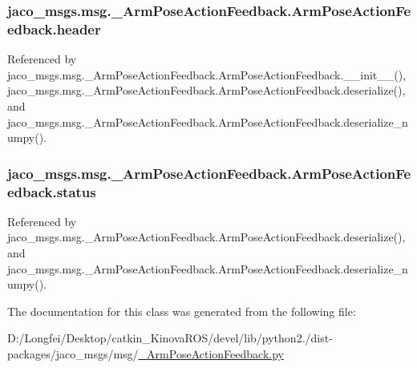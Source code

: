 \subsubsection[{\texorpdfstring{header}{header}}]{\setlength{\rightskip}{0pt plus 5cm}jaco\+\_\+msgs.\+msg.\+\_\+\+Arm\+Pose\+Action\+Feedback.\+Arm\+Pose\+Action\+Feedback.\+header}\hypertarget{classjaco__msgs_1_1msg_1_1__ArmPoseActionFeedback_1_1ArmPoseActionFeedback_a29a02efc077766aa6b97432487639dfe}{}\label{classjaco__msgs_1_1msg_1_1__ArmPoseActionFeedback_1_1ArmPoseActionFeedback_a29a02efc077766aa6b97432487639dfe}


Referenced by jaco\+\_\+msgs.\+msg.\+\_\+\+Arm\+Pose\+Action\+Feedback.\+Arm\+Pose\+Action\+Feedback.\+\_\+\+\_\+init\+\_\+\+\_\+(), jaco\+\_\+msgs.\+msg.\+\_\+\+Arm\+Pose\+Action\+Feedback.\+Arm\+Pose\+Action\+Feedback.\+deserialize(), and jaco\+\_\+msgs.\+msg.\+\_\+\+Arm\+Pose\+Action\+Feedback.\+Arm\+Pose\+Action\+Feedback.\+deserialize\+\_\+numpy().

\subsubsection[{\texorpdfstring{status}{status}}]{\setlength{\rightskip}{0pt plus 5cm}jaco\+\_\+msgs.\+msg.\+\_\+\+Arm\+Pose\+Action\+Feedback.\+Arm\+Pose\+Action\+Feedback.\+status}\hypertarget{classjaco__msgs_1_1msg_1_1__ArmPoseActionFeedback_1_1ArmPoseActionFeedback_a401e259f50e0f76aa3b79d712f3ef72c}{}\label{classjaco__msgs_1_1msg_1_1__ArmPoseActionFeedback_1_1ArmPoseActionFeedback_a401e259f50e0f76aa3b79d712f3ef72c}


Referenced by jaco\+\_\+msgs.\+msg.\+\_\+\+Arm\+Pose\+Action\+Feedback.\+Arm\+Pose\+Action\+Feedback.\+deserialize(), and jaco\+\_\+msgs.\+msg.\+\_\+\+Arm\+Pose\+Action\+Feedback.\+Arm\+Pose\+Action\+Feedback.\+deserialize\+\_\+numpy().



The documentation for this class was generated from the following file\+:\begin{DoxyCompactItemize}
\item 
D\+:/\+Longfei/\+Desktop/catkin\+\_\+\+Kinova\+R\+O\+S/devel/lib/python2./dist-\/packages/jaco\+\_\+msgs/msg/\hyperlink{__ArmPoseActionFeedback_8py}{\+\_\+\+Arm\+Pose\+Action\+Feedback.\+py}\end{DoxyCompactItemize}
